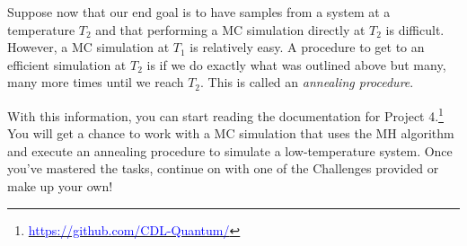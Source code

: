 \documentclass[12pt]{article}
\begin{document}
Suppose now that our end goal is to have samples from a system at a temperature $T_2$ and that performing a MC simulation directly at $T_2$ is difficult. However, a MC simulation at $T_1$ is relatively easy. A procedure to get to an efficient simulation at $T_2$ is if we do exactly what was outlined above but many, many more times until we reach $T_2$. This is called an {\it annealing procedure}. 

With this information, you can start reading the documentation for Project 4.\footnote{\href{https://github.com/CDL-Quantum/CohortProject_2020/tree/master/Project_4_Franck_Condon_Factors}
{\textcolor{blue}{https://github.com/CDL-Quantum/}}} You will get a chance to work with a MC simulation that uses the MH algorithm and execute an annealing procedure to simulate a low-temperature system. Once you've mastered the tasks, continue on with one of the Challenges provided or make up your own!

\newpage



\end{document}
